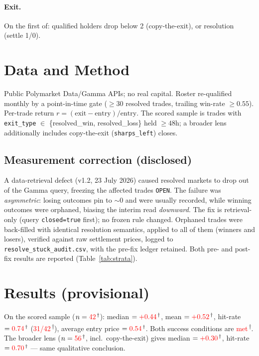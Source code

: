 \documentclass[11pt]{article}
\newcommand{\prov}[1]{\textcolor{red}{#1}\textsuperscript{\,$\dagger$}}
\begin{document}
\paragraph{Exit.} On the first of: qualified holders drop below 2 (copy-the-exit),
or resolution (settle 1/0).

\section{Data and Method}
Public Polymarket Data/Gamma APIs; no real capital. Roster re-qualified monthly
by a point-in-time gate ($\geq 30$ resolved trades, trailing win-rate $\geq 0.55$).
Per-trade return $r = (\text{exit}-\text{entry})/\text{entry}$. The scored sample
is trades with \texttt{exit\_type} $\in$ \{resolved\_win, resolved\_loss\} held
$\geq 48$h; a broader lens additionally includes copy-the-exit (\texttt{sharps\_left})
closes.

\subsection{Measurement correction (disclosed)}
\label{sec:fix}
A data-retrieval defect (v1.2, 23 July 2026) caused resolved markets to drop out
of the Gamma query, freezing the affected trades \texttt{OPEN}. The failure was
\emph{asymmetric}: losing outcomes pin to $\sim$0 and were usually recorded, while
winning outcomes were orphaned, biasing the interim read \emph{downward}. The fix
is retrieval-only (query \texttt{closed=true} first); no frozen rule changed.
Orphaned trades were back-filled with identical resolution semantics, applied to
all of them (winners and losers), verified against raw settlement prices, logged
to \texttt{resolve\_stuck\_audit.csv}, with the pre-fix ledger retained. Both
pre- and post-fix results are reported (Table~\ref{tab:strata}).

\section{Results (provisional)}
\label{sec:results}
On the scored sample ($n=\prov{42}$): median $=\prov{+0.44}$, mean
$=\prov{+0.52}$, hit-rate $=\prov{0.74}$ (\prov{31/42}), average entry price
$=\prov{0.54}$. Both success conditions are \prov{met}. The broader lens
($n=\prov{56}$, incl.\ copy-the-exit) gives median $=\prov{+0.30}$,
hit-rate $=\prov{0.70}$ --- same qualitative conclusion.
\end{document}
